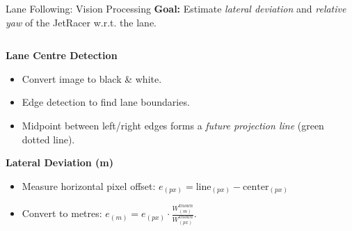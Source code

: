 \documentclass[aspectratio=169,12pt]{beamer}
\begin{document}
\begin{frame}[t]{Lane Following: Vision Processing}
  \vspace*{-0.3em}
  \textbf{Goal:} Estimate \textit{lateral deviation} and \textit{relative yaw} of the JetRacer w.r.t. the lane.

  \vspace{0.3em}
  \begin{columns}[T]
    \begin{column}{0.58\textwidth}
      \textbf{Lane Centre Detection}
      \begin{itemize}\setlength{\itemsep}{0.3em}
  
        \item Convert image to black \& white.
        \item Edge detection to find lane boundaries.
        \item Midpoint between left/right edges forms a \textit{future projection line} (green dotted line).
      \end{itemize}
      \vspace{0.4em}
      \textbf{Lateral Deviation (m)}
      \begin{itemize}\setlength{\itemsep}{0.3em}
        \item Measure horizontal pixel offset: \(e_{(px)} = \text{line}_{(px)} - \text{center}_{(px)}\)
        \item Convert to metres:\quad
        \(\displaystyle e_{(m)} = e_{(px)} \cdot \frac{W^{known}_{(m)}}{W^{known}_{(px)}}\).
      \end{itemize}
      \vspace{0.4em}
    \end{column}
    \begin{column}{0.42\textwidth}
      \centering

    \end{column}
  \end{columns}
\end{frame}
\end{document}
